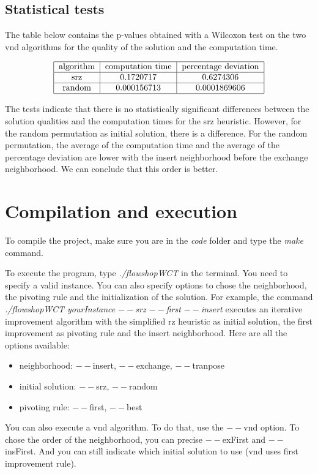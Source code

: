 \documentclass{article}
\begin{document}
\subsection{Statistical tests}

The table below contains the p-values obtained with a Wilcoxon test on the two vnd algorithms for the quality of the solution and the computation time.

\begin{align*}
\begin{tabular}{|c|c|c|} \hline
    algorithm & computation time & percentage deviation \\ \hline
    srz & 0.1720717 & 0.6274306 \\ \hline
    random & 0.000156713 & 0.0001869606 \\ \hline
\end{tabular}
\end{align*}

The tests indicate that there is no statistically significant differences between the solution qualities and the computation times for the srz heuristic.
However, for the random permutation as initial solution, there is a difference.
For the random permutation, the average of the computation time and the average of the percentage deviation are lower with the insert neighborhood before the exchange neighborhood.
We can conclude that this order is better.

\section{Compilation and execution}

To compile the project, make sure you are in the \textit{code} folder and type the \textit{make} command. \newline

To execute the program, type \textit{./flowshopWCT} in the terminal. You need to specify a valid instance.
You can also specify options to chose the neighborhood, the pivoting rule and the initialization of the solution.
For example, the command \textit{./flowshopWCT yourInstance $--$srz $--$first $--$insert} executes an iterative improvement algorithm with the simplified rz heuristic as initial solution, the first improvement as pivoting rule and the insert neighborhood. Here are all the options available: \newline

\begin{itemize}
    \item neighborhood: $--$insert, $--$exchange, $--$tranpose
    \item initial solution: $--$srz, $--$random
    \item pivoting rule: $--$first, $--$best
\end{itemize}

You can also execute a vnd algorithm. To do that, use the $--$vnd option. To chose the order of the neighborhood, you can precise $--$exFirst and $--$insFirst. And you can still indicate which initial solution to use (vnd uses first improvement rule).
\end{document}
